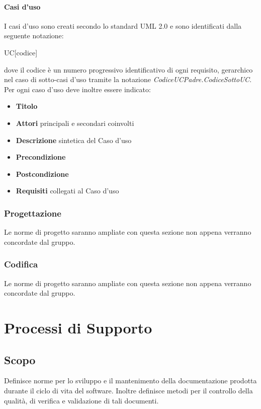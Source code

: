 \documentclass[12pt,a4paper]{article}
\begin{document}
\paragraph{Casi d'uso}
I casi d'uso sono creati secondo lo standard UML 2.0 e sono identificati dalla seguente notazione:
\begin{center}
UC[codice]
\end{center}
dove il codice è un numero progressivo identificativo di ogni requisito, gerarchico nel  caso di sotto-casi d'uso tramite la notazione \textit{CodiceUCPadre.CodiceSottoUC}. Per ogni caso d'uso deve inoltre essere indicato:
\begin{itemize}
\item \textbf{Titolo}
\item \textbf{Attori} principali e secondari coinvolti
\item \textbf{Descrizione} sintetica del Caso d'uso
\item \textbf{Precondizione}
\item \textbf{Postcondizione}
\item \textbf{Requisiti} collegati al Caso d'uso
\end{itemize}

\subsubsection{Progettazione}
Le norme di progetto saranno ampliate con questa sezione non appena verranno concordate dal gruppo.

\subsubsection{Codifica}
Le norme di progetto saranno ampliate con questa sezione non appena verranno concordate dal gruppo.

\newpage

\section{Processi di Supporto} %

\subsection{Scopo}
Definisce norme per lo sviluppo e il mantenimento della documentazione prodotta durante il ciclo di vita del software. Inoltre definisce metodi per il controllo della qualità, di verifica e validazione di tali documenti.
\end{document}
